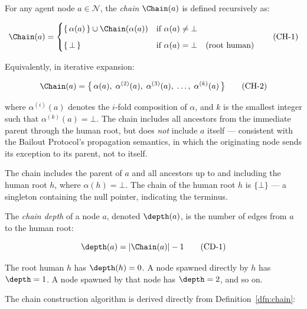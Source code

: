 \begin{dfn}
\label{dfn:chain}
For any agent node $a \in \mathcal{N}$, the \emph{chain} $\Chain(a)$ is defined recursively as:

\begin{equation}
\Chain(a) =
\begin{cases}
\{\,\alpha(a)\,\} \cup \Chain(\alpha(a)) & \text{if } \alpha(a) \neq \bot \\[6pt]
\{\,\bot\,\}                              & \text{if } \alpha(a) = \bot \quad (\text{root human})
\end{cases}
\tag{CH-1}
\end{equation}

Equivalently, in iterative expansion:

\begin{equation}
\Chain(a) = \bigl\{\, \alpha(a),\; \alpha^{(2)}(a),\; \alpha^{(3)}(a),\; \dots,\; \alpha^{(k)}(a) \,\bigr\}
\tag{CH-2}
\end{equation}

where $\alpha^{(i)}(a)$ denotes the $i$-fold composition of $\alpha$, and $k$ is the smallest integer such that $\alpha^{(k)}(a) = \bot$. The chain includes all ancestors from the immediate parent through the human root, but does \emph{not} include $a$ itself — consistent with the Bailout Protocol's propagation semantics, in which the originating node sends its exception to its parent, not to itself.
\end{dfn}

The chain includes the parent of $a$ and all ancestors up to and including the human root $h$, where $\alpha(h) = \bot$. The chain of the human root $h$ is $\{\bot\}$ — a singleton containing the null pointer, indicating the terminus.

\begin{dfn}
\label{dfn:chain-depth}
The \emph{chain depth} of a node $a$, denoted $\depth(a)$, is the number of edges from $a$ to the human root:

\begin{equation}
\depth(a) = |\Chain(a)| - 1
\tag{CD-1}
\end{equation}

The root human $h$ has $\depth(h) = 0$. A node spawned directly by $h$ has $\depth = 1$. A node spawned by that node has $\depth = 2$, and so on.
\end{dfn}

The chain construction algorithm is derived directly from Definition~\ref{dfn:chain}:

